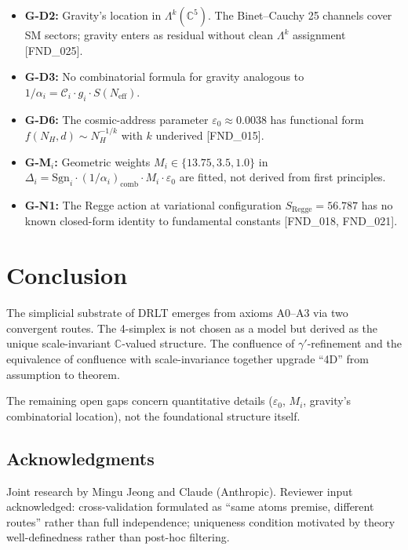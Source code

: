 \documentclass[11pt]{article}
\begin{document}
\begin{itemize}
\item \textbf{G-D2:} Gravity's location in $\Lambda^k(\mathbb{C}^5)$.
  The Binet--Cauchy 25 channels cover SM sectors; gravity enters as
  residual without clean $\Lambda^k$ assignment [FND\_025].
\item \textbf{G-D3:} No combinatorial formula for gravity analogous
  to $1/\alpha_i = \mathcal{C}_i \cdot g_i \cdot S(N_{\text{eff}})$.
\item \textbf{G-D6:} The cosmic-address parameter
  $\varepsilon_0 \approx 0.0038$ has functional form
  $f(N_H, d) \sim N_H^{-1/k}$ with $k$ underived [FND\_015].
\item \textbf{G-M$_i$:} Geometric weights
  $M_i \in \{13.75, 3.5, 1.0\}$ in $\Delta_i = \text{Sgn}_i \cdot
  (1/\alpha_i)_{\text{comb}} \cdot M_i \cdot \varepsilon_0$ are
  fitted, not derived from first principles.
\item \textbf{G-N1:} The Regge action at variational configuration
  $S_{\text{Regge}} = 56.787$ has no known closed-form identity
  to fundamental constants [FND\_018, FND\_021].
\end{itemize}

\section{Conclusion}

The simplicial substrate of DRLT emerges from axioms A0--A3 via
two convergent routes. The 4-simplex is not chosen as a model
but derived as the unique scale-invariant $\mathbb{C}$-valued
structure. The confluence of $\gamma'$-refinement and the
equivalence of confluence with scale-invariance together
upgrade ``4D'' from assumption to theorem.

The remaining open gaps concern quantitative details
($\varepsilon_0$, $M_i$, gravity's combinatorial location),
not the foundational structure itself.

\subsection*{Acknowledgments}

Joint research by Mingu Jeong and Claude (Anthropic).
Reviewer input acknowledged: cross-validation formulated as
``same atoms premise, different routes'' rather than full
independence; uniqueness condition motivated by theory
well-definedness rather than post-hoc filtering.
\end{document}
